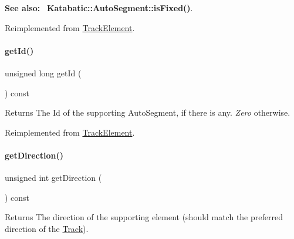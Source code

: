 {\bfseries See also\+:}~ \textbf{ Katabatic\+::\+Auto\+Segment\+::is\+Fixed()}. 

Reimplemented from \mbox{\hyperlink{classKite_1_1TrackElement_afd7362b850709bed8b61c1aa22399f97}{Track\+Element}}.

\mbox{\label{classKite_1_1TrackFixedSegment_afdedcef127ad2a3677a5b48d7d3453f3}} 
\paragraph{\texorpdfstring{get\+Id()}{getId()}}
{\footnotesize\ttfamily unsigned long get\+Id (\begin{DoxyParamCaption}{ }\end{DoxyParamCaption}) const\hspace{0.3cm}{\ttfamily [virtual]}}

\begin{DoxyReturn}{Returns}
The {\ttfamily Id} of the supporting Auto\+Segment, if there is any. {\itshape Zero} otherwise. 
\end{DoxyReturn}


Reimplemented from \mbox{\hyperlink{classKite_1_1TrackElement_afdedcef127ad2a3677a5b48d7d3453f3}{Track\+Element}}.

\mbox{\label{classKite_1_1TrackFixedSegment_a0dd7cf705ace42c662c289955313b2e9}} 
\paragraph{\texorpdfstring{get\+Direction()}{getDirection()}}
{\footnotesize\ttfamily unsigned int get\+Direction (\begin{DoxyParamCaption}{ }\end{DoxyParamCaption}) const\hspace{0.3cm}{\ttfamily [virtual]}}

\begin{DoxyReturn}{Returns}
The direction of the supporting element (should match the preferred direction of the \mbox{\hyperlink{classKite_1_1Track}{Track}}). 
\end{DoxyReturn}



